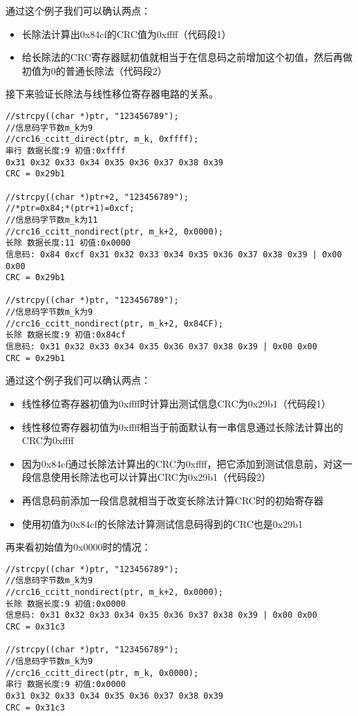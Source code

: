 \documentclass[
]{article}
\begin{document}
通过这个例子我们可以确认两点：

\begin{itemize}
\item
  长除法计算出0x84cf的CRC值为0xffff（代码段1）
\item
  给长除法的CRC寄存器赋初值就相当于在信息码之前增加这个初值，然后再做初值为0的普通长除法（代码段2）
\end{itemize}

接下来验证长除法与线性移位寄存器电路的关系。

\begin{verbatim}
//strcpy((char *)ptr, "123456789");
//信息码字节数m_k为9
//crc16_ccitt_direct(ptr, m_k, 0xffff);
串行 数据长度:9 初值:0xffff
0x31 0x32 0x33 0x34 0x35 0x36 0x37 0x38 0x39
CRC = 0x29b1

//strcpy((char *)ptr+2, "123456789");
//*ptr=0x84;*(ptr+1)=0xcf;
//信息码字节数m_k为11
//crc16_ccitt_nondirect(ptr, m_k+2, 0x0000);
长除 数据长度:11 初值:0x0000
信息码: 0x84 0xcf 0x31 0x32 0x33 0x34 0x35 0x36 0x37 0x38 0x39 | 0x00 0x00
CRC = 0x29b1

//strcpy((char *)ptr, "123456789");
//信息码字节数m_k为9
//crc16_ccitt_nondirect(ptr, m_k+2, 0x84CF);
长除 数据长度:9 初值:0x84cf
信息码: 0x31 0x32 0x33 0x34 0x35 0x36 0x37 0x38 0x39 | 0x00 0x00
CRC = 0x29b1
\end{verbatim}

通过这个例子我们可以确认两点：

\begin{itemize}
\item
  线性移位寄存器初值为0xffff时计算出测试信息CRC为0x29b1（代码段1）
\item
  线性移位寄存器初值为0xffff相当于前面默认有一串信息通过长除法计算出的CRC为0xffff
\item
  因为0x84cf通过长除法计算出的CRC为0xffff，把它添加到测试信息前，对这一段信息使用长除法也可以计算出CRC为0x29b1（代码段2）
\item
  再信息码前添加一段信息就相当于改变长除法计算CRC时的初始寄存器
\item
  使用初值为0x84cf的长除法计算测试信息码得到的CRC也是0x29b1
\end{itemize}

再来看初始值为0x0000时的情况：

\begin{verbatim}
//strcpy((char *)ptr, "123456789");
//信息码字节数m_k为9
//crc16_ccitt_nondirect(ptr, m_k+2, 0x0000);
长除 数据长度:9 初值:0x0000
信息码: 0x31 0x32 0x33 0x34 0x35 0x36 0x37 0x38 0x39 | 0x00 0x00
CRC = 0x31c3

//strcpy((char *)ptr, "123456789");
//信息码字节数m_k为9
//crc16_ccitt_direct(ptr, m_k, 0x0000);
串行 数据长度:9 初值:0x0000
0x31 0x32 0x33 0x34 0x35 0x36 0x37 0x38 0x39
CRC = 0x31c3
\end{verbatim}
\end{document}
